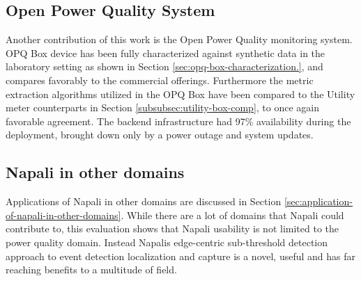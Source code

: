 \subsection{Open Power Quality System}\label{subsec:open-power-quality-system}
Another contribution of this work is the Open Power Quality monitoring system.
OPQ Box device has been fully characterized against synthetic data in the laboratory setting as shown in Section \ref{sec:opq-box-characterization.},
and compares favorably to the commercial offerings.
Furthermore the metric extraction algorithms utilized in the OPQ Box have been compared to the Utility meter counterparts in Section \ref{subsubsec:utility-box-comp}, to once again favorable agreement.
The backend infrastructure had 97\% availability during the deployment, brought down only by a power outage and system updates.

\subsection{Napali in other domains}\label{subsec:napali-in-other-domains2}
Applications of Napali in other domains are discussed in Section \ref{sec:application-of-napali-in-other-domains}.
While there are a lot of domains that Napali could contribute to, this evaluation shows that Napali usability is not limited to the power quality domain.
Instead Napalis edge-centric sub-threshold detection approach to event detection localization and capture is a novel, useful and has far reaching benefits to a multitude of field.
